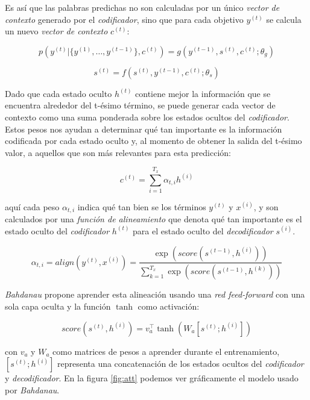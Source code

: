 Es así que las palabras predichas no son calculadas por un único \textit{vector de contexto} generado
por el \textit{codificador}, sino que para cada objetivo $y^{(t)}$ se calcula un nuevo \textit{vector
de contexto} $c^{(t)}$:


\begin{equation}
    p(y^{(t)} | \{y^{(1)}, \dots , y^{(t-1)}\}, c^{(t)}) = g(y^{(t-1)}, s^{(t)}, c^{(t)}; \theta_g)
\end{equation}

\begin{equation}
    s^{(t)} = f(s^{(t)}, y^{(t-1)}, c^{(t)}; \theta_s)
\end{equation}

Dado que cada estado oculto $h^{(t)}$ contiene mejor la información que se encuentra alrededor del
t-ésimo término, se puede generar cada vector de contexto como una suma ponderada sobre los estados
ocultos del \textit{codificador}. Estos pesos nos ayudan a determinar qué tan importante es la
información codificada por cada estado oculto y, al momento de obtener la salida del t-ésimo valor,
 a aquellos que son más relevantes para esta predicción:


\begin{equation}
    c^{(t)} = \sum_{i=1}^{T_x} \alpha_{t,i} h^{(i)}
\end{equation}

\noindent aquí cada peso $\alpha_{t,i}$ indica qué tan bien se  los términos $y^{(t)}$ y $x^{(i)}$,
y son calculados por una \textit{función de alineamiento} que denota qué tan importante es el estado
oculto del \textit{codificador} $h^{(t)}$ para el estado oculto del \textit{decodificador} $s^{(i)}$.


\begin{equation}
    \alpha_{t,i} = align(y^{(t)}, x^{(i)}) = \frac{\exp(score(s^{(t-1)}, h^{(i)}))}{\sum_{k=1}^{T_x} \exp(score(s^{(t-1)}, h^{(k)}))}
    \label{eq:b_align}
\end{equation}

\textit{Bahdanau} propone aprender esta alineación usando una \textit{red feed-forward} con una sola
capa oculta y la función $\tanh$ como activación:

\begin{equation}
    score(s^{(t)}, h^{(i)}) = v^\top_a \tanh(W_a[s^{(t)};h^{(i)}])
    \label{eq:concat}
\end{equation}

\noindent con $v_a$ y $W_a$ como matrices de pesos a aprender durante el entrenamiento, $[s^{(t)};h^{(i)}]$
representa una concatenación de los estados ocultos del \textit{codificador} y \textit{decodificador}.
En la figura \ref{fig:att} podemos ver gráficamente el modelo usado por \textit{Bahdanau}.

